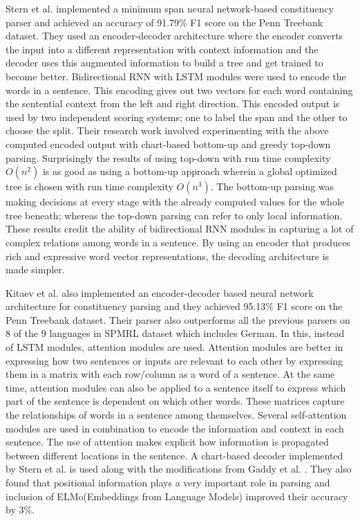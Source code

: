 \documentclass[a4paper, 11pt]{article}
\begin{document}
Stern et al. \parencite*{Stern2017} implemented a minimum span neural network-based constituency parser and achieved an accuracy of 91.79\% F1 score on the Penn Treebank dataset. They used an encoder-decoder architecture where the encoder converts the input into a different representation with context information and the decoder uses this augmented information to build a tree and get trained to become better. Bidirectional RNN with LSTM \parencite{schuster1997} modules were used to encode the words in a sentence. This encoding gives out two vectors for each word containing the sentential context from the left and right direction. This encoded output is used by two independent scoring systems; one to label the span and the other to choose the split. Their research work involved experimenting with the above computed encoded output with chart-based bottom-up and greedy top-down parsing. Surprisingly the results of using top-down with run time complexity $O(n^2)$ is as good as using a bottom-up approach wherein a global optimized tree is chosen with run time complexity $O(n^3)$. The bottom-up parsing was making decisions at every stage with the already computed values for the whole tree beneath; whereas the top-down parsing can refer to only local information. These results credit the ability of bidirectional RNN modules in capturing a lot of complex relations among words in a sentence. By using an encoder that produces rich and expressive word vector representations, the decoding architecture is made simpler. 

Kitaev et al. \parencite*{Kitaev2019} also implemented an encoder-decoder based neural network architecture for constituency parsing and they achieved 95.13\% F1 score on the Penn Treebank dataset. Their parser also outperforms all the previous parsers on 8 of the 9 languages in SPMRL dataset which includes German. In this, instead of LSTM modules, attention modules \parencite*{Vaswani2017} are used. Attention modules are better in expressing how two sentences or inputs are relevant to each other by expressing them in a matrix with each row/column as a word of a sentence. At the same time, attention modules can also be applied to a sentence itself to express which part of the sentence is dependent on which other words. These matrices capture the relationships of words in a sentence among themselves. Several self-attention modules are used in combination to encode the information and context in each sentence. The use of attention makes explicit how information is propagated between different locations in the sentence. A chart-based decoder implemented by Stern et al. \parencite*{Stern2017} is used along with the modifications from Gaddy et al. \parencite*{Gaddy2018}. They also found that positional information plays a very important role in parsing and inclusion of ELMo(Embeddings from Language Models) \parencite{peters2018deep} improved their accuracy by 3\%. 
\end{document}
